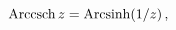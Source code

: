 \[\mathop{\mathrm{Arccsch}\/}\nolimits z=\mathop{\mathrm{Arcsinh}\/}\nolimits\!%
\left(1/z\right),\]